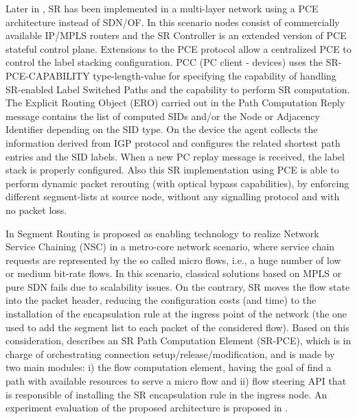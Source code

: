 Later in \cite{sdnandpce}, SR has been implemented in a multi-layer network using a PCE architecture instead of SDN/OF. In this scenario nodes consist of commercially available IP/MPLS routers and the SR Controller is an extended version of PCE stateful control plane. Extensions to the PCE protocol allow a centralized PCE to control the label stacking configuration. PCC (PC client - devices) uses the SR-PCE-CAPABILITY type-length-value for specifying the capability of handling SR-enabled Label Switched Paths and the capability to perform SR computation. The Explicit Routing Object (ERO) carried out in the Path Computation Reply message contains the list of computed SIDs and/or the Node or Adjacency Identifier depending on the SID type. On the device the agent collects the information derived from IGP protocol and configures the related shortest path entries and the SID labels. When a new PC replay message is received, the label stack is properly configured. Also this SR implementation using PCE is able to perform dynamic packet rerouting (with optical bypass capabilities), by enforcing different segment-lists at source node, without any signalling protocol and with no packet loss.

In \cite{paolucci2018network} Segment Routing is proposed as enabling technology to realize Network Service Chaining (NSC) in a metro-core network scenario, where service chain requests are represented by the so called micro flows, i.e., a huge number of low or medium bit-rate flows.
In this scenario, classical solutions based on MPLS or pure SDN fails due to scalability issues.
On the contrary, SR moves the flow state into the packet header, reducing the configuration costs (and time) to the installation of the encapsulation rule at the ingress point of the network (the one used to add the segment list to each packet of the considered flow).
Based on this consideration, \cite{paolucci2018network} describes an SR Path Computation Element (SR-PCE), which is in charge of orchestrating connection setup/release/modification, and is made by two main modules: i) the flow computation element, having the goal of find a path with available resources to serve a micro flow and ii) flow steering API that is responsible of installing the SR encapsulation rule in the ingress node.
An experiment evaluation of the proposed architecture is proposed in \cite{paolucci2017service}.

